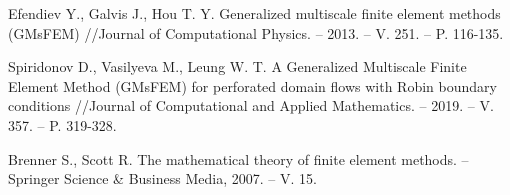 \documentclass[10pt]{article}
\begin{document}
\begin{thebibliography}{8}
Efendiev Y., Galvis J., Hou T. Y. Generalized multiscale finite element methods (GMsFEM) //Journal of Computational Physics. – 2013. – V. 251. – P. 116-135.

Spiridonov D., Vasilyeva M., Leung W. T. A Generalized Multiscale Finite Element Method (GMsFEM) for perforated domain flows with Robin boundary conditions //Journal of Computational and Applied Mathematics. – 2019. – V. 357. – P. 319-328.

Brenner S., Scott R. The mathematical theory of finite element methods. – Springer Science \& Business Media, 2007. – V. 15.

\end{thebibliography}
\end{document}
